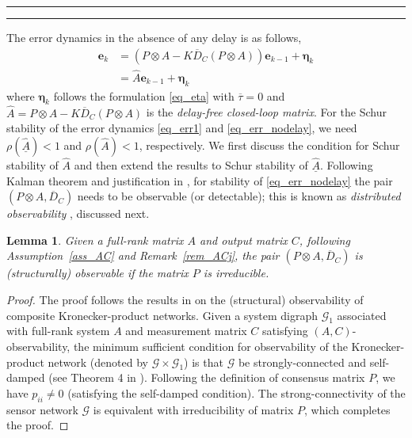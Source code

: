 \documentclass[journal]{IEEEtran}
\newtheorem{lem}{Lemma}
\def\mb{\mathbf}
\def\mc{\mathcal}
\begin{document}
\hfill\rule[-6pt]{0.4pt}{6.4pt}%
\rule{\dimexpr(0.5\columnsep-1pt)}{0.4pt}

The error dynamics in the absence of any delay is as follows,
\begin{align} \nonumber
	\mb{e}_{k} &= (P\otimes A - K \overline{D}_C (P\otimes A))\mb{e}_{k-1} +
	\mb{\eta}_k \\
	&= \widehat{A} \mb{e}_{k-1} + 	\mb{\eta}_k 
	\label{eq_err_nodelay}
\end{align}
where  $\mb{\eta}_k$ follows  the formulation \eqref{eq_eta} with $\overline{\tau}=0$ and $\widehat{A}=P\otimes A - K \overline{D}_C (P\otimes A)$ is the \textit{ delay-free closed-loop matrix}. 
For the Schur stability of the error dynamics \eqref{eq_err1} and \eqref{eq_err_nodelay}, we need $\rho(\underline{\widehat{A}})<1$ and $\rho(\widehat{A})<1$, respectively. We first discuss the condition for Schur stability of $\widehat{A}$ and then extend the results to Schur stability of $\underline{\widehat{A}}$. Following Kalman theorem  and  justification in \cite{jstsp,usman_cdc:11}, for stability of \eqref{eq_err_nodelay} the pair $(P\otimes A, \overline{D}_C)$ needs to be observable (or detectable); this is known as \textit{distributed observability} \cite{jstsp}, discussed next. 

\begin{lem} \label{lem_irreducible}
	Given a full-rank matrix $A$ and output matrix $C$, following Assumption~\ref{ass_AC} and Remark~\ref{rem_ACj}, the pair $(P\otimes A, \overline{D}_C) $ is (structurally) observable if the matrix $P$ is irreducible.
\end{lem}
\begin{proof}
	The proof follows the results in \cite{tsipn_kron} on the (structural) observability of  composite Kronecker-product networks. Given a system digraph $\mc{G}_1$ associated with full-rank system $A$ and measurement matrix $C$ satisfying $(A,C)$-observability, the minimum sufficient condition for observability of the Kronecker-product network (denoted by $\mc{G} \times \mc{G}_1$) is that $\mc{G}$ be strongly-connected and self-damped (see Theorem 4 in \cite{tsipn_kron}). Following the definition of consensus matrix $P$, we have $p_{ii} \neq 0$ (satisfying the self-damped condition). The strong-connectivity of the  sensor network $\mc{G}$ is equivalent with irreducibility of matrix $P$, which completes the proof. 
\end{proof}
\end{document}
